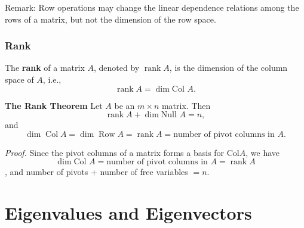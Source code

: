 \documentclass[10pt, a4paper]{article}
\begin{document}
\indent Remark: Row operations may change the linear dependence relations among the rows of a matrix, but not the dimension of the row space.\\

\subsubsection*{Rank}
\begin{definition}
    The \textbf{rank} of a matrix $A$, denoted by $\operatorname{rank} A$, is the dimension of the column space of $A$, i.e., \[
    \operatorname{rank} A = \dim \text{Col }A.
    \]
\end{definition}
\begin{proposition}
    \textbf{The Rank Theorem} Let $A$ be an $m\times n$ matrix. Then \[
    \operatorname{rank} A + \dim \text{Null }A = n,
    \]
    and \[
    \operatorname*{dim} \operatorname*{Col} A = \operatorname*{dim} \operatorname*{Row} A = \operatorname*{rank} A = \text{number of pivot columns in }A.
    \]
\end{proposition}
\indent \textit{Proof.} Since the pivot columns of a matrix forms a basis for Col$A$, we have $$\dim \text{Col }A = \text{number of pivot columns in }A = \operatorname{rank} A$$, and number of pivots $+$ number of free variables $= n$.\\

\newpage

\section{Eigenvalues and Eigenvectors}
\end{document}
